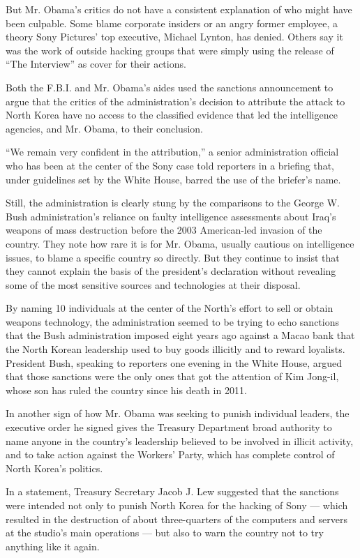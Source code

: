 But Mr. Obama's critics do not have a consistent explanation of who
might have been culpable. Some blame corporate insiders or an angry
former employee, a theory Sony Pictures' top executive, Michael Lynton,
has denied. Others say it was the work of outside hacking groups that
were simply using the release of ``The Interview'' as cover for their
actions.

Both the F.B.I. and Mr. Obama's aides used the sanctions announcement to
argue that the critics of the administration's decision to attribute the
attack to North Korea have no access to the classified evidence that led
the intelligence agencies, and Mr. Obama, to their conclusion.

``We remain very confident in the attribution,'' a senior administration
official who has been at the center of the Sony case told reporters in a
briefing that, under guidelines set by the White House, barred the use
of the briefer's name.

Still, the administration is clearly stung by the comparisons to the
George W. Bush administration's reliance on faulty intelligence
assessments about Iraq's weapons of mass destruction before the 2003
American-led invasion of the country. They note how rare it is for Mr.
Obama, usually cautious on intelligence issues, to blame a specific
country so directly. But they continue to insist that they cannot
explain the basis of the president's declaration without revealing some
of the most sensitive sources and technologies at their disposal.

By naming 10 individuals at the center of the North's effort to sell or
obtain weapons technology, the administration seemed to be trying to
echo sanctions that the Bush administration imposed eight years ago
against a Macao bank that the North Korean leadership used to buy goods
illicitly and to reward loyalists. President Bush, speaking to reporters
one evening in the White House, argued that those sanctions were the
only ones that got the attention of Kim Jong-il, whose son has ruled the
country since his death in 2011.

In another sign of how Mr. Obama was seeking to punish individual
leaders, the executive order he signed gives the Treasury Department
broad authority to name anyone in the country's leadership believed to
be involved in illicit activity, and to take action against the Workers'
Party, which has complete control of North Korea's politics.

In a statement, Treasury Secretary Jacob J. Lew suggested that the
sanctions were intended not only to punish North Korea for the hacking
of Sony --- which resulted in the destruction of about three-quarters of
the computers and servers at the studio's main operations --- but also
to warn the country not to try anything like it again.

